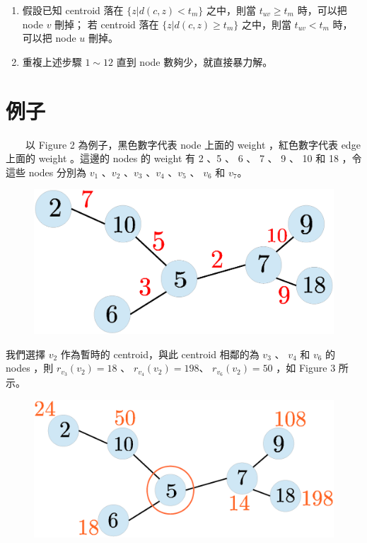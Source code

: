 \documentclass[12pt]{article}
\begin{document}
\begin{CJK}{UTF8}{bkai}
\begin{enumerate}
\item 假設已知 centroid 落在 $\{z|d(c,z)<t_m\}$ 之中，則當 $t_{uv}\geq t_m$ 時，可以把 node $v$ 刪掉；
若 centroid 落在 $\{z|d(c,z)\geq t_m\}$ 之中，則當 $t_{uv} < t_m$ 時， 可以把 node $u$ 刪掉。 

\item 重複上述步驟 $1\sim12$ 直到 node 數夠少，就直接暴力解。

\end{enumerate}

\section{例子}

~~~~以 Figure 2 為例子，黑色數字代表 node 上面的 weight ，紅色數字代表 edge 上面的 weight 。這邊的 nodes
的 weight 有 2 、5 、 6 、 7 、 9 、 10 和 18 ，令這些 nodes 分別為 $v_1$ 、$v_2$ 、$v_3$ 、$v_4$ 、$v_5$
、 $v_6$  和 $v_7$。

\begin{figure}[H]
\centering
\includegraphics[scale=0.3]{fig2.eps}
\caption{}
\end{figure}

我們選擇 $v_2$ 作為暫時的 centroid，與此 centroid 相鄰的為 $v_3$ 、 $v_4$ 和 $v_6$ 的 nodes ，則
$r_{v_3}(v_2)=18$ 、 $r_{v_4}(v_2)=198$、 $r_{v_6}(v_2)=50$ ，如 Figure 3 所示。

\begin{figure}[H]
\centering
\includegraphics[scale=0.3]{fig3.eps}
\caption{}
\end{figure}


\end{CJK}
\end{document}
